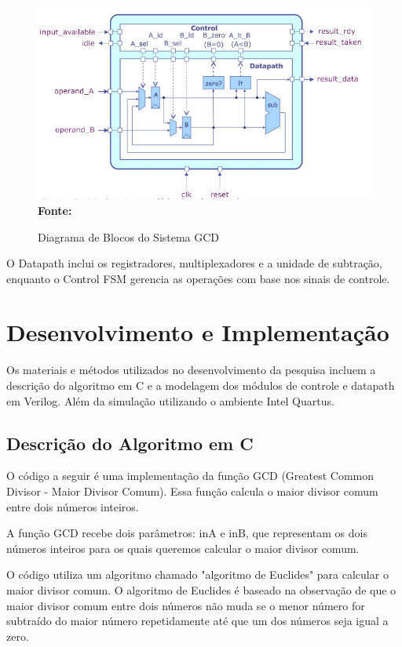 \documentclass[a4paper,11pt]{article} %
\begin{document}
\begin{figure}[ht]
    \centering
    \caption{Diagrama de Blocos do Sistema GCD}
    \includegraphics[width=17cm,angle=0]{imgs/diagram_block_control_datapath.png}
    \\\textbf{Fonte:} \cite{cse_taylor_michael}
    \label{fig:diagram_block}
\end{figure}

O Datapath inclui os registradores, multiplexadores e a unidade de subtração,
enquanto o Control FSM gerencia as operações com base nos sinais de controle.

\clearpage
\section{Desenvolvimento e Implementação}

Os materiais e métodos utilizados no desenvolvimento da pesquisa
incluem a descrição do algoritmo em C e
a modelagem dos módulos de controle e datapath em Verilog.
Além da simulação utilizando o ambiente Intel Quartus.

\subsection{Descrição do Algoritmo em C}

O código a seguir é uma implementação da função GCD (Greatest Common Divisor - Maior Divisor Comum).
Essa função calcula o maior divisor comum entre dois números inteiros.

A função GCD recebe dois parâmetros: inA e inB,
que representam os dois números inteiros para os quais
queremos calcular o maior divisor comum.

O código utiliza um algoritmo chamado "algoritmo de Euclides"
para calcular o maior divisor comum.
O algoritmo de Euclides é baseado na observação de que
o maior divisor comum entre dois números não muda
se o menor número for subtraído do maior número repetidamente
até que um dos números seja igual a zero.
\end{document}
